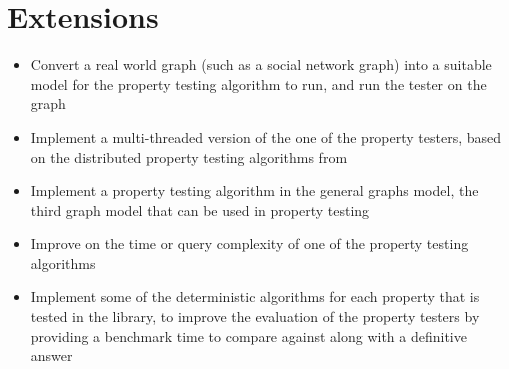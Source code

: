 \documentclass[11pt,a4paper]{article}
\begin{document}
\section{Extensions}
\begin{itemize}
    \item Convert a real world graph (such as a social network graph) into a suitable model for the property testing algorithm to run, and run the tester on the graph
    \item Implement a multi-threaded version of the one of the property testers, based on the distributed property testing algorithms from \cite{censor}
    \item Implement a property testing algorithm in the general graphs model, the third graph model that can be used in property testing
    \item Improve on the time or query complexity of one of the property testing algorithms
    \item Implement some of the deterministic algorithms for each property that is tested in the library, to improve the evaluation of the property testers by providing a benchmark time to compare against along with a definitive answer
\end{itemize}
\end{document}
